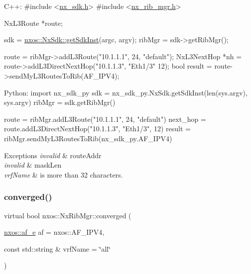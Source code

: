 \begin{DoxyCode}
C++:
\textcolor{preprocessor}{     #include <\mbox{\hyperlink{nx__sdk_8h}{nx\_sdk.h}}>}
\textcolor{preprocessor}{     #include <\mbox{\hyperlink{nx__rib__mgr_8h}{nx\_rib\_mgr.h}}>}

     NxL3Route    *route;

     sdk = \mbox{\hyperlink{classnxos_1_1_nx_sdk_a5050e2d26c40744b4fc7862068a83f39}{nxos::NxSdk::getSdkInst}}(argc, argv);
     ribMgr = sdk->getRibMgr();

     route = ribMgr->addL3Route(\textcolor{stringliteral}{"10.1.1.1"}, 24, \textcolor{stringliteral}{"default"});
     NxL3NextHop *nh = route->addL3DirectNextHop(\textcolor{stringliteral}{"10.1.1.3"}, 
                                                 \textcolor{stringliteral}{"Eth1/3"} 12);
     \textcolor{keywordtype}{bool} result = route->sendMyL3RoutesToRib(AF\_IPV4);

Python:
     \textcolor{keyword}{import} nx\_sdk\_py
     sdk = nx\_sdk\_py.NxSdk.getSdkInst(len(sys.argv), sys.argv)
     ribMgr = sdk.getRibMgr()

     route = ribMgr.addL3Route(\textcolor{stringliteral}{"10.1.1.1"}, 24, \textcolor{stringliteral}{"default"})
     next\_hop = route.addL3DirectNextHop(\textcolor{stringliteral}{"10.1.1.3"}, \textcolor{stringliteral}{"Eth1/3"}, 12)
     result = ribMgr.sendMyL3RoutesToRib(nx\_sdk\_py.AF\_IPV4)
\end{DoxyCode}



\begin{DoxyExceptions}{Exceptions}
{\em invalid} & route\+Addr \\
\hline
{\em invalid} & mask\+Len \\
\hline
{\em vrf\+Name} & is more than 32 characters. \\
\hline
\end{DoxyExceptions}
\mbox{\label{classnxos_1_1_nx_rib_mgr_a7edd313ab7852713469d84ac588cd08d}} 
\subsubsection{\texorpdfstring{converged()}{converged()}}
{\footnotesize\ttfamily virtual bool nxos\+::\+Nx\+Rib\+Mgr\+::converged (\begin{DoxyParamCaption}\item[{\mbox{\hyperlink{nx__common_8h_a3a667f48b94db10aa398940dc5bf72d7}{nxos\+::af\+\_\+e}}}]{af = {\ttfamily nxos\+:\+:AF\+\_\+IPV4},  }\item[{const std\+::string \&}]{vrf\+Name = {\ttfamily \char`\"{}all\char`\"{}} }\end{DoxyParamCaption})\hspace{0.3cm}{\ttfamily [pure virtual]}}


